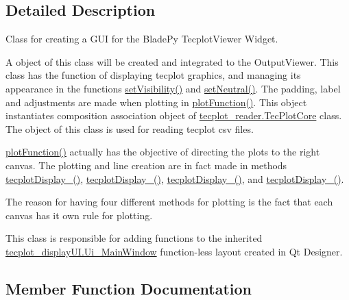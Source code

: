 \subsection{Detailed Description}
Class for creating a G\+UI for the Blade\+Py Tecplot\+Viewer Widget. 

A object of this class will be created and integrated to the Output\+Viewer. This class has the function of displaying tecplot graphics, and managing its appearance in the functions \hyperlink{a00117_ae50e0f3c4051d791ed30a2e9de5233ea}{set\+Visibility()} and \hyperlink{a00117_ad80163041f7884f536d1421860c4adc2}{set\+Neutral()}. The padding, label and adjustments are made when plotting in \hyperlink{a00117_a62c9724fbeda8d8780e57559bada3282}{plot\+Function()}. This object instantiates composition association object of \hyperlink{a00125}{tecplot\+\_\+reader.\+Tec\+Plot\+Core} class. The object of this class is used for reading tecplot csv files.

\hyperlink{a00117_a62c9724fbeda8d8780e57559bada3282}{plot\+Function()} actually has the objective of directing the plots to the right canvas. The plotting and line creation are in fact made in methods \hyperlink{a00117_ae792d997329b65cfed0b8a0a5feaa1a2}{tecplot\+Display\+\_()}, \hyperlink{a00117_aec1f3f862b488e5f66161ca7241908c1}{tecplot\+Display\+\_()}, \hyperlink{a00117_ae29c235476c3ca1ff19f4b933b86ed86}{tecplot\+Display\+\_()}, and \hyperlink{a00117_acdc9dc387494507084a2ab2cc0c8d9ac}{tecplot\+Display\+\_()}.

The reason for having four different methods for plotting is the fact that each canvas has it own rule for plotting.

This class is responsible for adding functions to the inherited \hyperlink{a00121}{tecplot\+\_\+display\+U\+I.\+Ui\+\_\+\+Main\+Window} function-\/less layout created in Qt Designer. 

\subsection{Member Function Documentation}
\hypertarget{a00117_a6b4350a2c6ee537dba6bbe1549778636}{}\label{a00117_a6b4350a2c6ee537dba6bbe1549778636} 
